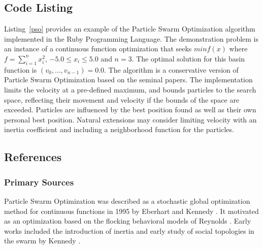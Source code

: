 \subsection{Code Listing}
Listing~\ref{pso} provides an example of the Particle Swarm Optimization algorithm implemented in the Ruby Programming Language. 
The demonstration problem is an instance of a continuous function optimization that seeks $min f(x)$ where $f=\sum_{i=1}^n x_{i}^2$, $-5.0\leq x_i \leq 5.0$ and $n=3$. The optimal solution for this basin function is $(v_0,\ldots,v_{n-1})=0.0$.
The algorithm is a conservative version of Particle Swarm Optimization based on the seminal papers. The implementation limits the velocity at a pre-defined maximum, and bounds particles to the search space, reflecting their movement and velocity if the bounds of the space are exceeded. Particles are influenced by the best position found as well as their own personal best position. Natural extensions may consider limiting velocity with an inertia coefficient and including a neighborhood function for the particles.



\subsection{References}

% 
% 
\subsubsection{Primary Sources}
Particle Swarm Optimization was described as a stochastic global optimization method for continuous functions in 1995 by Eberhart and Kennedy \cite{Eberhart1995, Kennedy1995}. It motivated as an optimization based on the flocking behavioral models of Reynolds \cite{Reynolds1987}.
Early works included the introduction of inertia \cite{Shi1998} and early study of social topologies in the swarm by Kennedy \cite{Kennedy1999}. 

